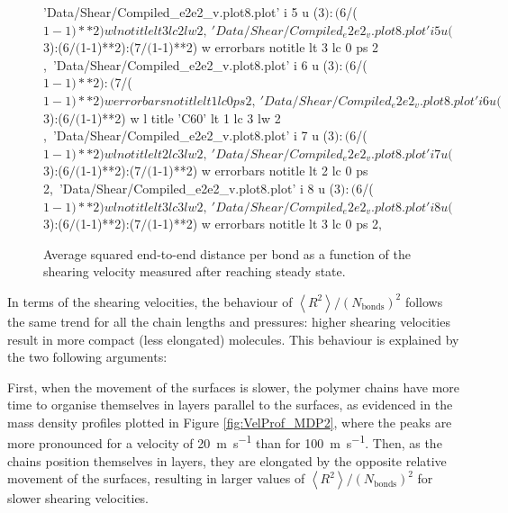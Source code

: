 \documentclass[aps,prb,reprint,superscriptaddress, a4paper]{revtex4-1}
\begin{document}
\begin{figure}
\begin{center}
\begin{gnuplot}[terminal=pdf, terminaloptions={size \SERFigwidth cm, \SERFigheight cm color solid}]
				'Data/Shear/Compiled_e2e2_v.plot8.plot' i 5 u ($3):($6/($1-1)**2) w l notitle lt 3 lc 2 lw 2 ,\
				'Data/Shear/Compiled_e2e2_v.plot8.plot' i 5 u ($3):($6/($1-1)**2):($7/($1-1)**2) w errorbars notitle lt 3 lc 0 ps 2 ,\
				'Data/Shear/Compiled_e2e2_v.plot8.plot' i 6 u ($3):($6/($1-1)**2):($7/($1-1)**2) w errorbars notitle lt 1 lc 0 ps 2 ,\
				'Data/Shear/Compiled_e2e2_v.plot8.plot' i 6 u ($3):($6/($1-1)**2) w l title 'C60' lt 1 lc 3 lw 2 ,\				
				'Data/Shear/Compiled_e2e2_v.plot8.plot' i 7 u ($3):($6/($1-1)**2) w l notitle  lt 2 lc 3 lw 2 ,\
				'Data/Shear/Compiled_e2e2_v.plot8.plot' i 7 u ($3):($6/($1-1)**2):($7/($1-1)**2) w errorbars notitle  lt 2 lc 0 ps 2,\
				'Data/Shear/Compiled_e2e2_v.plot8.plot' i 8 u ($3):($6/($1-1)**2) w l notitle  lt 3 lc 3 lw 2 ,\
				'Data/Shear/Compiled_e2e2_v.plot8.plot' i 8 u ($3):($6/($1-1)**2):($7/($1-1)**2) w errorbars notitle  lt 3 lc 0 ps 2,\
		\end{gnuplot}
		\caption{Average squared end-to-end distance per bond as a function of the shearing velocity measured after reaching steady state.}
		\label{fig:e2e2_v}
	\end{center}
 \end{figure}



In terms of the shearing velocities, the behaviour of $\left< R^2 \right>/\left(N_\text{bonds}\right)^2$ follows the same trend for all the chain lengths and pressures: higher shearing velocities result in more compact (less elongated) molecules. This behaviour is explained by the two following arguments:

First,  when the movement of the surfaces is slower, the  polymer chains have more time to organise themselves in layers parallel to the surfaces, as evidenced in the mass density profiles plotted in Figure \ref{fig:VelProf_MDP2}, where the peaks are more pronounced for  a velocity of \SI{20}{\meter\per\second} than for \SI{100}{\meter\per\second}. Then, as the chains position themselves in layers, they are  elongated by the opposite relative movement of the surfaces, resulting in larger values of $\left< R^2 \right>/\left(N_\text{bonds}\right)^2$ for slower shearing velocities.
\end{document}
